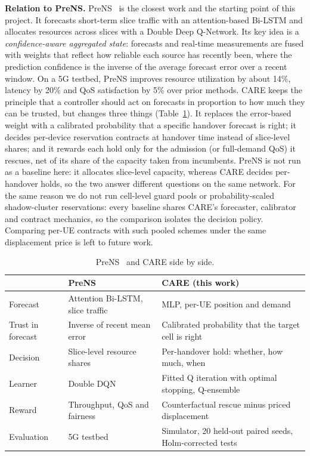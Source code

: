 \documentclass[conference]{IEEEtran}
\begin{document}
\textbf{Relation to PreNS.} PreNS~\cite{wu2026prens} is the closest work and the starting point of this project. It forecasts short-term slice traffic with an attention-based Bi-LSTM and allocates resources across slices with a Double Deep Q-Network. Its key idea is a \emph{confidence-aware aggregated state}: forecasts and real-time measurements are fused with weights that reflect how reliable each source has recently been, where the prediction confidence is the inverse of the average forecast error over a recent window. On a 5G testbed, PreNS improves resource utilization by about 14\%, latency by 20\% and QoS satisfaction by 5\% over prior methods. CARE keeps the principle that a controller should act on forecasts in proportion to how much they can be trusted, but changes three things (Table~\ref{tab:prens}). It replaces the error-based weight with a calibrated probability that a specific handover forecast is right; it decides per-device reservation contracts at handover time instead of slice-level shares; and it rewards each hold only for the admission (or full-demand QoS) it rescues, net of its share of the capacity taken from incumbents. PreNS is not run as a baseline here: it allocates slice-level capacity, whereas CARE decides per-handover holds, so the two answer different questions on the same network. For the same reason we do not run cell-level guard pools or probability-scaled shadow-cluster reservations: every baseline shares CARE's forecaster, calibrator and contract mechanics, so the comparison isolates the decision policy. Comparing per-UE contracts with such pooled schemes under the same displacement price is left to future work.

\begin{table}[!t]
\centering
\caption{PreNS~\cite{wu2026prens} and CARE side by side.}
\label{tab:prens}
\footnotesize
\setlength{\tabcolsep}{3pt}
\begin{tabular}{>{\raggedright\arraybackslash}p{}>{\raggedright\arraybackslash}p{}>{\raggedright\arraybackslash}p{}}
\toprule
 & PreNS & CARE (this work)\\
\midrule
Forecast & Attention Bi-LSTM, slice traffic & MLP, per-UE position and demand\\
Trust in forecast & Inverse of recent mean error & Calibrated probability that the target cell is right\\
Decision & Slice-level resource shares & Per-handover hold: whether, how much, when\\
Learner & Double DQN & Fitted Q iteration with optimal stopping, Q-ensemble\\
Reward & Throughput, QoS and fairness & Counterfactual rescue minus priced displacement\\
Evaluation & 5G testbed & Simulator, 20 held-out paired seeds, Holm-corrected tests\\
\bottomrule
\end{tabular}
\end{table}
\end{document}
